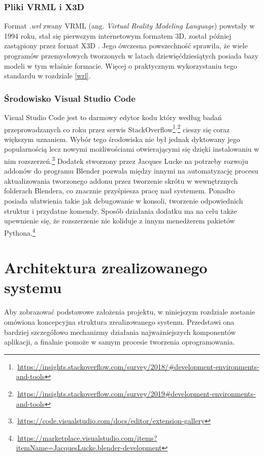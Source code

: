 \documentclass[brudnopis]{xmgr}
\begin{document}
\subsection{Pliki VRML i X3D}
Format \emph{.wrl} zwany VRML (ang. \emph {Virtual Reality Modeling Language}) powstały w 1994 roku, stał się pierwszym internetowym formatem 3D, został później zastąpiony przez format X3D \cite{vrml}. Jego ówczesna powszechność sprawiła, że wiele programów przemysłowych tworzonych w latach dziewięćdziesiątych posiada bazy modeli w tym właśnie formacie. Więcej o praktycznym wykorzystaniu tego standardu w rozdziale \ref{wrl}.


\subsection{Środowisko Visual Studio Code}
Visual Studio Code jest to darmowy edytor kodu który według badań przeprowadzanych co roku przez serwis StackOverflow\footnote{\,\url{https://insights.stackoverflow.com/survey/2018/\#development-environments-and-tools}}$^{,}$\footnote{\,\url{https://insights.stackoverflow.com/survey/2019\#development-environments-and-tools}} cieszy się coraz większym uznaniem. Wybór tego środowiska nie był jednak dyktowany jego popularnością lecz nowymi możliwościami otwierającymi się dzięki instalowaniu w nim rozszerzeń.\footnote{\,\url{https://code.visualstudio.com/docs/editor/extension-gallery}} Dodatek stworzony przez Jacques Lucke na potrzeby rozwoju addonów do programu Blender pozwala między innymi na automatyzację procesu aktualizowania tworzonego addonu przez tworzenie skrótu w wewnętrznych folderach Blendera, co znacznie przyśpiesza pracę nad systemem. Ponadto posiada ułatwienia takie jak debugowanie w konsoli, tworzenie odpowiednich struktur i przydatne komendy. Sposób działania dodatku ma na celu także upewnienie się, że rozszerzenie nie koliduje z innym menedżerem pakietów Pythona.\footnote{\,\url{https://marketplace.visualstudio.com/items?itemName=JacquesLucke.blender-development}} 

\chapter{Architektura zrealizowanego systemu}
Aby zobrazować podstawowe założenia projektu, w niniejszym rozdziale zostanie omówiona koncepcyjna struktura zrealizowanego systemu. Przedstawi ona bardziej szczegółowo mechanizmy działania najważniejszych komponentów aplikacji, a finalnie pomoże w samym procesie tworzenia oprogramowania.
\end{document}
